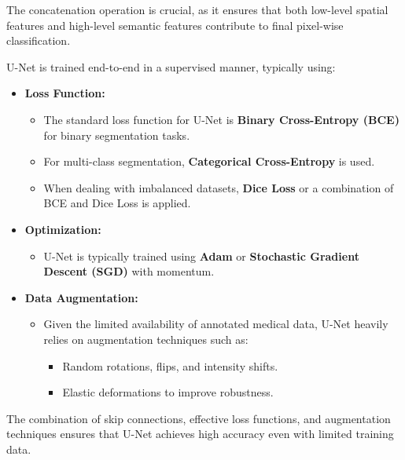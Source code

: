 \begin{enrichment}
\begin{enrichment}
		\noindent The concatenation operation is crucial, as it ensures that both low-level spatial features and high-level semantic features contribute to final pixel-wise classification.
		
	\end{enrichment}
	
	\begin{enrichment}[Training U-Net][subsection]
		
		\noindent U-Net is trained end-to-end in a supervised manner, typically using:
		
		\begin{itemize}
			\item \textbf{Loss Function:} 
			\begin{itemize}
				\item The standard loss function for U-Net is \textbf{Binary Cross-Entropy (BCE)} for binary segmentation tasks.
				\item For multi-class segmentation, \textbf{Categorical Cross-Entropy} is used.
				\item When dealing with imbalanced datasets, \textbf{Dice Loss} or a combination of BCE and Dice Loss is applied.
			\end{itemize}
			
			\item \textbf{Optimization:} 
			\begin{itemize}
				\item U-Net is typically trained using 
				\textbf{Adam} or 
				\textbf{Stochastic Gradient Descent (SGD)} with momentum.
			\end{itemize}
			
			\item \textbf{Data Augmentation:} 
			\begin{itemize}
				\item Given the limited availability of annotated medical data, U-Net heavily relies on augmentation techniques such as:
				\begin{itemize}
					\item Random rotations, flips, and intensity shifts.
					\item Elastic deformations to improve robustness.
				\end{itemize}
			\end{itemize}
		\end{itemize}
		
		\noindent The combination of skip connections, effective loss functions, and augmentation techniques ensures that U-Net achieves high accuracy even with limited training data.
		

\end{enrichment}
\end{enrichment}
